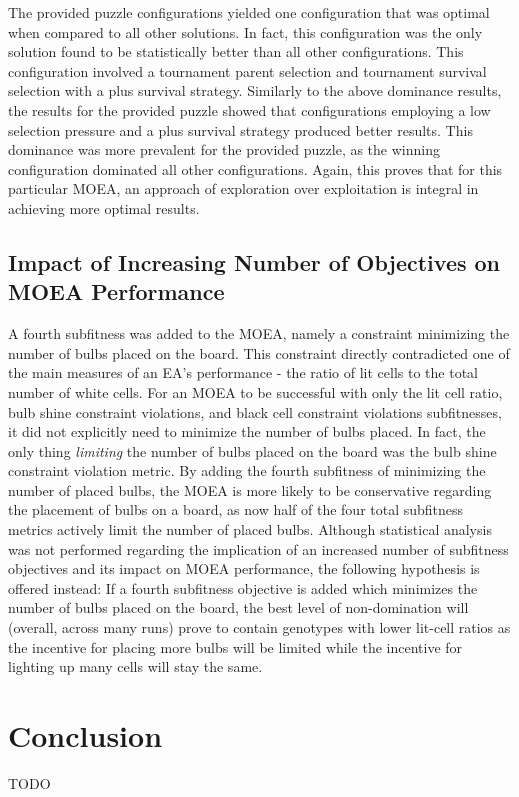 \documentclass[11pt]{article}
\begin{document}
The provided puzzle configurations yielded one configuration that was optimal when compared 
to all other solutions. In fact,
this configuration was the only solution found to be statistically better than all other 
configurations. This configuration involved
a tournament parent selection and tournament survival selection with a plus survival strategy.
Similarly to the above dominance results, the results for the provided puzzle showed that 
configurations employing a low selection pressure and a plus survival strategy produced better 
results. This dominance was more prevalent for the provided puzzle, as the winning configuration
dominated all other configurations. Again, this proves that for this particular MOEA, an approach
of exploration over exploitation is integral in achieving more optimal results.


\subsection{Impact of Increasing Number of Objectives on MOEA Performance}

A fourth subfitness was added to the MOEA, namely a constraint minimizing
the number of bulbs placed on the board. This constraint directly contradicted one of the main
measures of an EA's performance - the ratio of lit cells to the total number of white cells.
For an MOEA to be successful with only the lit cell ratio, bulb shine constraint violations, and
black cell constraint violations subfitnesses, it did not explicitly need to minimize the number 
of bulbs
placed. In fact, the only thing \textit{limiting} the number of bulbs placed on the board was the
bulb shine constraint violation metric. By adding the fourth subfitness of minimizing the number
of placed bulbs, the MOEA is more likely to be conservative regarding the placement of bulbs on
a board, as now half of the four total subfitness metrics actively limit the number of placed bulbs.
Although statistical analysis was not performed regarding the implication of an increased number
of subfitness objectives and its impact on MOEA performance, the following hypothesis is offered
instead: If a fourth subfitness objective is added which minimizes the number of bulbs placed
on the board, the best level of non-domination will (overall, across many runs) prove to contain 
genotypes with lower lit-cell ratios as the incentive for placing more bulbs will be limited
while the incentive for lighting up many cells will stay the same.


\section{Conclusion}

TODO
\end{document}
